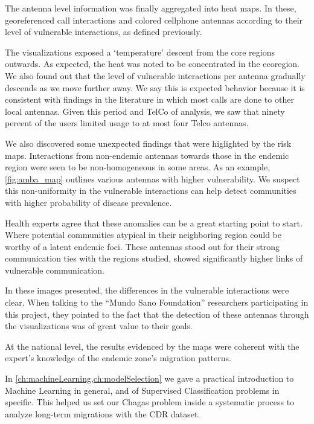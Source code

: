 
The antenna level information was finally aggregated into heat maps. 
In these, georeferenced call interactions and colored cellphone antennas according to their level of vulnerable interactions, as defined previously.

The visualizations exposed a `temperature' descent from the core regions outwards.
As expected, the heat was noted to be concentrated in the ecoregion.
We also found out that the level of vulnerable interactions per antenna gradually descends as we move further away.
We say this is expected behavior because it is consistent with findings in the literature in which most calls are done to other local antennas. %
Given this period and TelCo of analysis, we saw that ninety percent of the users limited usage to at most four Telco antennas.

We also discovered some unexpected findings that were higlighted by the risk maps.
Interactions from non-endemic antennas towards those in the endemic region were seen to be non-homogeneous in some areas.
As an example, \cref{fig:amba_map} outlines various antennas with higher vulnerability.
We suspect this non-uniformity in the vulnerable interactions can help detect communities with higher probability of disease prevalence.

Health experts agree that these anomalies can be a great starting point to start.
Where potential communities atypical in their neighboring region could be worthy of a latent endemic foci.
These antennas stood out for their strong communication ties with the regions studied, showed significantly higher links of vulnerable communication.

In these images presented, the differences in the vulnerable interactions were clear.
When talking to the ``Mundo Sano Foundation'' researchers participating in this project, they pointed to the fact that the detection of these antennas through the visualizations was of great value to their goals.


At the national level, the results evidenced by the maps were coherent with the expert's knowledge of the endemic zone's migration patterns.



In \cref{ch:machineLearning,ch:modelSelection} we gave a practical introduction to Machine Learning in general, and of Supervised Classification problems in specific. 
This helped us set our Chagas problem inside a systematic process to analyze long-term migrations with the CDR dataset.

